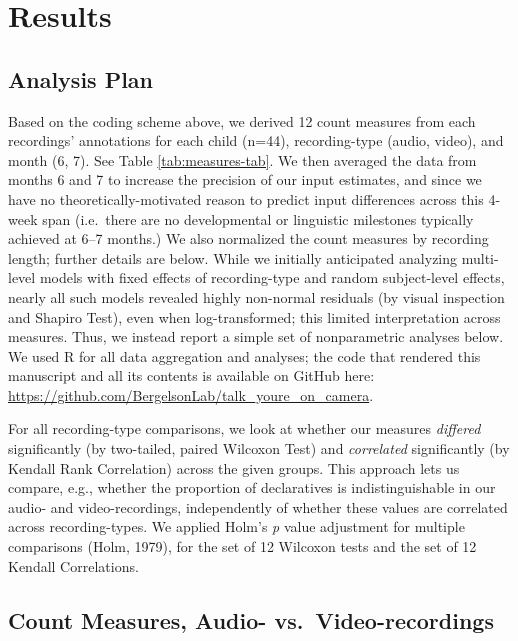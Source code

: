 \documentclass[floatsintext,man]{apa6}
\theoremstyle{definition}
\theoremstyle{definition}
\theoremstyle{definition}
\theoremstyle{remark}
\begin{document}
\hypertarget{results}{%
\section{Results}\label{results}}

\hypertarget{analysis-plan}{%
\subsection{Analysis Plan}\label{analysis-plan}}

Based on the coding scheme above, we derived 12 count measures from each
recordings' annotations for each child (n=44), recording-type (audio,
video), and month (6, 7). See Table \ref{tab:measures-tab}. We then
averaged the data from months 6 and 7 to increase the precision of our
input estimates, and since we have no theoretically-motivated reason to
predict input differences across this 4-week span (i.e.~there are no
developmental or linguistic milestones typically achieved at 6--7
months.) We also normalized the count measures by recording length;
further details are below. While we initially anticipated analyzing
multi-level models with fixed effects of recording-type and random
subject-level effects, nearly all such models revealed highly non-normal
residuals (by visual inspection and Shapiro Test), even when
log-transformed; this limited interpretation across measures. Thus, we
instead report a simple set of nonparametric analyses below. We used R
for all data aggregation and analyses; the code that rendered this
manuscript and all its contents is available on GitHub here:
\url{https://github.com/BergelsonLab/talk_youre_on_camera}.

For all recording-type comparisons, we look at whether our measures
\emph{differed} significantly (by two-tailed, paired Wilcoxon Test) and
\emph{correlated} significantly (by Kendall Rank Correlation) across the
given groups. This approach lets us compare, e.g., whether the
proportion of declaratives is indistinguishable in our audio- and
video-recordings, independently of whether these values are correlated
across recording-types. We applied Holm's \emph{p} value adjustment for
multiple comparisons (Holm, 1979), for the set of 12 Wilcoxon tests and
the set of 12 Kendall Correlations.

\hypertarget{count-measures-audio--vs.video-recordings}{%
\subsection{Count Measures, Audio-
vs.~Video-recordings}\label{count-measures-audio--vs.video-recordings}}
\end{document}
